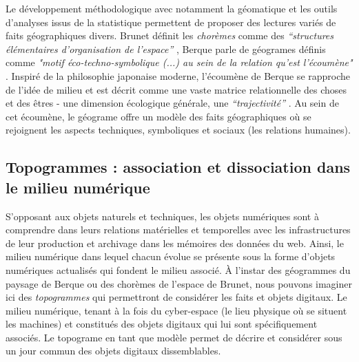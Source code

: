 Le développement méthodologique avec notamment la géomatique et les outils d’analyses issus de la statistique permettent de proposer des lectures variés de faits géographiques divers. Brunet définit les \textit{chorèmes} comme des \textit{“structures élémentaires d'organisation de l'espace”} \citep{Brunet1980}, Berque parle de géogrames définis comme \textit{"motif éco-techno-symbolique (...) au sein de la relation qu'est l'écoumène"} \citep{Berque1999}. Inspiré de la philosophie japonaise moderne, l’écoumène de Berque se rapproche de l’idée de milieu et est décrit comme une vaste matrice relationnelle des choses et des êtres - une dimension écologique générale, une \textit{“trajectivité”} \citep{Watsuji2011}. Au sein de cet écoumène, le géograme offre un modèle des faits géographiques où se rejoignent les aspects techniques, symboliques et sociaux (les relations humaines). 


\subsection[Topogrammes : association et dissociation dans le milieu numérique]{Topogrammes : association et dissociation dans le milieu numérique}

S’opposant aux objets naturels et techniques, les objets numériques sont à comprendre dans leurs relations matérielles et temporelles avec les infrastructures de leur production et archivage dans les mémoires des données du web. Ainsi, le milieu numérique dans lequel chacun évolue se présente sous la forme d’objets numériques actualisés qui fondent le milieu associé. À l’instar des géogrammes du paysage de Berque ou des chorèmes de l’espace de Brunet, nous pouvons imaginer ici des \textit{topogrammes} qui permettront de considérer les faits et objets digitaux. Le milieu numérique, tenant à la fois du cyber-espace (le lieu physique où se situent les machines) et constitués des objets digitaux qui lui sont spécifiquement associés. Le topograme en tant que modèle permet de décrire et considérer sous un jour commun des objets digitaux dissemblables.

